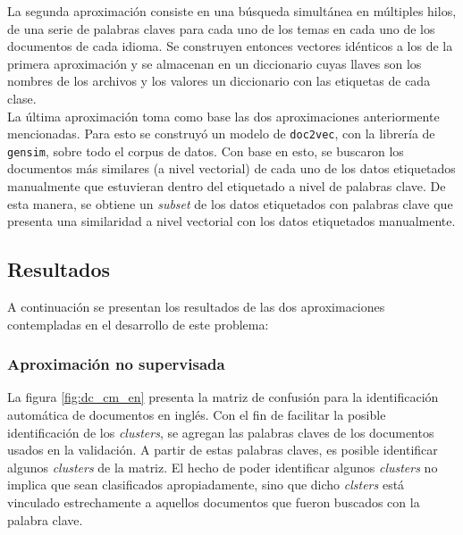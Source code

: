 La segunda aproximación consiste en una búsqueda simultánea en múltiples hilos, de una serie de palabras claves para cada uno de los temas en cada uno de los documentos de cada idioma. Se construyen entonces vectores idénticos a los de la primera aproximación y se almacenan en un diccionario cuyas llaves son los nombres de los archivos y los valores un diccionario con las etiquetas de cada clase.\\

La última aproximación toma como base las dos aproximaciones anteriormente mencionadas. Para esto se construyó un modelo de \texttt{doc2vec}, con la librería de \texttt{gensim}, sobre todo el corpus de datos. Con base en esto, se buscaron los documentos más similares (a nivel vectorial) de cada uno de los datos etiquetados manualmente que estuvieran dentro del etiquetado a nivel de palabras clave. De esta manera, se obtiene un \textit{subset} de los datos etiquetados con palabras clave que presenta una similaridad a nivel vectorial con los datos etiquetados manualmente.

\subsection{Resultados}
A continuación se presentan los resultados de las dos aproximaciones contempladas en el desarrollo de este problema:

\subsubsection{Aproximación no supervisada}
La figura \ref{fig:dc_cm_en} presenta la matriz de confusión para la identificación automática de documentos en inglés. Con el fin de facilitar la posible identificación de los \textit{clusters}, se agregan las palabras claves de los documentos usados en la validación. A partir de estas palabras claves, es posible identificar algunos \textit{clusters} de la matriz. El hecho de poder identificar algunos \textit{clusters} no implica que sean clasificados apropiadamente, sino que dicho \textit{clsters} está vinculado estrechamente a aquellos documentos que fueron buscados con la palabra clave. \\


